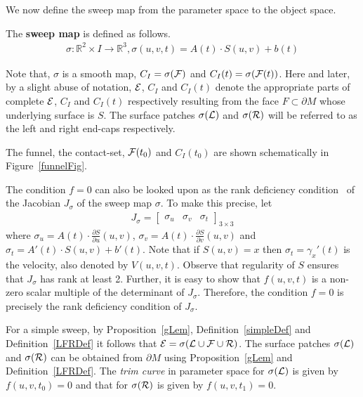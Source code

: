 \documentclass{elsart5p}
\begin{document}
We now define the sweep map from the parameter space to the object space.
\begin{defn} \label{sigmaDef}
The {\bf sweep map} is defined as follows.
\begin{align*}
\sigma: \mathbb{R}^2 \times I \to \mathbb{R}^3, \sigma(u,v,t) = A(t) \cdot S(u,v) + b(t)
\end{align*} 
\end{defn}
Note that, $\sigma$ is a smooth map, $C_I = \sigma({\cal F})$ and $C_I(t) = \sigma({\cal F}(t))$. 
Here and later, by a slight abuse of notation, ${\cal E}$, $C_I$ and $C_I(t)$ denote the 
appropriate parts of complete ${\cal E}$, $C_I$ and $C_I(t)$ respectively 
resulting from the face $F \subset \partial M$ whose underlying surface is $S$.
The surface patches $\sigma({\cal L})$ and $\sigma({\cal R})$ will be referred to as the 
left and right end-caps respectively.

The funnel, the contact-set, ${\cal F}(t_0)$ and $C_I(t_0)$ are shown schematically in Figure~\ref{funnelFig}.

The condition $f = 0$ can also be looked upon as the rank deficiency condition~\cite{jacobian} of the 
Jacobian $J_{\sigma}$ of the sweep map $\sigma$.  To make this precise, let
\begin{align} \label{jacobianEq}
J_{\sigma} = \begin{bmatrix} \sigma_u & \sigma_v & \sigma_t \end{bmatrix} _{3 \times 3}
\end{align}
where $\sigma_u = A(t) \cdot \frac{\partial S}{\partial u}(u,v)$, 
$\sigma_v = A(t) \cdot \frac{\partial S}{\partial v}(u,v)$  and 
$\sigma_t = A'(t)\cdot S(u,v) + b'(t)$. Note that if $S(u,v) = x$ then 
$\sigma_t = \gamma_x'(t)$ is the velocity, also denoted by $V(u,v,t)$.   
Observe that  regularity of $S$ ensures 
that $J_{\sigma}$ has rank at least 2.  Further, it is easy to show that 
$f(u,v,t)$ is a non-zero scalar multiple of the determinant of $J_{\sigma}$.
Therefore, the condition $f=0$ is precisely the rank deficiency 
condition of $J_{\sigma}$.

For a simple sweep, by Proposition~\ref{gLem}, Definition~\ref{simpleDef} and Definition~\ref{LFRDef} it 
follows that 
${\cal E} = \sigma({\cal L} \cup {\cal F} \cup {\cal R})$. 
The surface patches $\sigma({\cal L})$ and $\sigma({\cal R})$ can be obtained 
from $\partial M$ using Proposition~\ref{gLem} and Definition~\ref{LFRDef}.  The {\em trim curve}
 in parameter space for $\sigma({\cal L})$ is given by $f(u,v,t_0) = 0 $ and that for 
$\sigma({\cal R})$ is given by $f(u,v,t_1) = 0$.  
\end{document}
